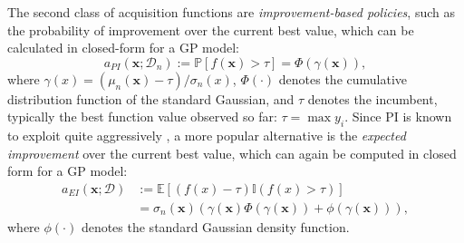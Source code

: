\documentclass[10pt,letterpaper]{article} %
\begin{document}
The second class of acquisition functions are \emph{improvement-based policies}, such as the probability of improvement \citep[PI,][]{kushner_new_1964} over the current best value, which can be calculated in closed-form for a GP model:
$$a_{PI}(\mathbf{x}; \mathcal{D}_n) := \mathbb{P}[f(\mathbf{x}) > \tau] = \Phi(\gamma(\mathbf{x})),$$
where $\gamma(x) = (\mu_n(\mathbf{x}) - \tau) / \sigma_n(x)$, $\Phi(\cdot)$ denotes the cumulative distribution function of the
standard Gaussian, and $\tau$ denotes the incumbent, typically the best function value observed so far: $\tau = \max y_i$.
Since PI is known to exploit quite aggressively \cite{jones_taxonomy_2001}, a more popular
alternative is the \emph{expected improvement} \citep[EI,][]{mockus_application_1978} over the
current best value, which can again be computed in closed form for a GP model:
\begin{equation*}
\begin{split}
 a_{EI}(\mathbf{x}; \mathcal{D})
  & := \mathbb{E}[(f(x) - \tau)\mathbb{I}(f(x) > \tau)] \\
  &  = \sigma_n(\mathbf{x})\left(\gamma(\mathbf{x})\Phi(\gamma(\mathbf{x})) + \phi(\gamma(\mathbf{x}))\right),
\end{split}
\end{equation*}
where $\phi(\cdot)$ denotes the standard Gaussian density function.
\end{document}
